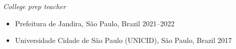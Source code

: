 \documentclass[margin, 10pt]{res} %
\begin{document}
\begin{resume}
{\sl College prep teacher}
\begin{itemize}
\item Prefeitura de Jandira, São Paulo, Brazil \hfill 2021--2022
\item Universidade Cidade de São Paulo (UNICID), São Paulo, Brazil \hfill 2017
\end{itemize}

\end{resume}
\end{document}
